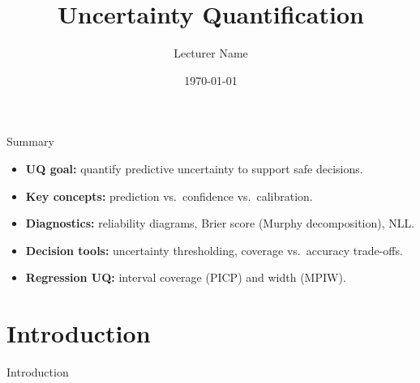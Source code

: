 \documentclass[aspectratio=169]{beamer}
\title[UQ in Data Science]{Uncertainty Quantification}
\author{Lecturer Name}
\date{\today}
\begin{document}
\begin{frame}
    \titlepage
\end{frame}

\begin{frame}{Summary}
  \begin{itemize}
    \item \textbf{UQ goal:} quantify predictive uncertainty to support safe decisions.
    \item \textbf{Key concepts:} prediction vs.\ confidence vs.\ calibration.
    \item \textbf{Diagnostics:} reliability diagrams, Brier score (Murphy decomposition), NLL.
    \item \textbf{Decision tools:} uncertainty thresholding, coverage vs.\ accuracy trade-offs.
    \item \textbf{Regression UQ:} interval coverage (PICP) and width (MPIW).
  \end{itemize}
\end{frame}


\section{Introduction}

\begin{frame}[plain]
    \centering
    \vfill
    {Introduction \par}
    \vfill
  \end{frame}
\end{document}

